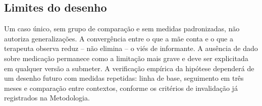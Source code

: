 \subsection{Limites do desenho}

Um caso \'unico, sem grupo de compara\c{c}\~ao e sem medidas padronizadas, n\~ao autoriza generaliza\c{c}\~oes. A converg\^encia entre o que a m\~ae conta e o que a terapeuta observa reduz -- n\~ao elimina -- o vi\'es de informante. A aus\^encia de dado sobre medica\c{c}\~ao permanece como a limita\c{c}\~ao mais grave e deve ser explicitada em qualquer vers\~ao a submeter. A verifica\c{c}\~ao emp\'irica da hip\'otese depender\'a de um desenho futuro com medidas repetidas: linha de base, seguimento em tr\^es meses e compara\c{c}\~ao entre contextos, conforme os crit\'erios de invalida\c{c}\~ao j\'a registrados na Metodologia.
